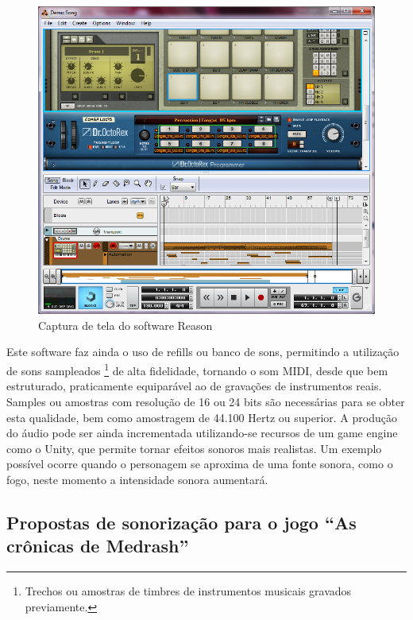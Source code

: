 \begin{figure}[!ht]
 \centering
 \includegraphics[scale=0.6]{musica_reason.png}
 \caption{Captura de tela do software Reason}
 \label{img:reason}
\end{figure}

Este software faz ainda o uso de refills ou banco de sons, permitindo a utilização de sons sampleados
\footnote{Trechos ou amostras de timbres de instrumentos musicais gravados previamente.}
 de alta fidelidade, tornando o som MIDI, desde que bem estruturado, praticamente equiparável ao de gravações de instrumentos reais. Samples ou amostras com resolução de 16 ou 24 bits são necessárias para se obter esta qualidade, bem como amostragem de 44.100 Hertz ou superior. 
A produção do áudio pode ser ainda incrementada utilizando-se recursos de um game engine como o Unity, que permite tornar efeitos sonoros mais realistas. Um exemplo possível ocorre quando o personagem se aproxima de uma fonte sonora, como o fogo, neste momento a intensidade sonora aumentará.

\subsection{Propostas de sonorização para o jogo ``As crônicas de Medrash''}

